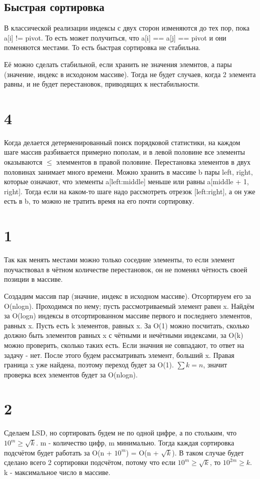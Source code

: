 \documentclass[12pt]{extarticle}
\begin{document}
\subsection*{Быстрая сортировка}
В классической реализации индексы с двух сторон изменяются до тех пор, пока a[i] != pivot. То есть может получиться, что a[i] == a[j] == pivot и они поменяются местами. То есть быстрая сортировка не стабильна.

Её можно сделать стабильной, если хранить не значения элемнтов, а пары (значение, индекс в исходоном массиве). Тогда не будет случаев, когда 2 элемента равны, и не будет перестановок, приводящих к нестабильности.


\section*{4}
Когда делается детерменированный поиск порядковой статистики, на каждом шаге массив разбивается примерно пополам, и в левой половине все элементы оказываются $\le$ элемментов в правой половине. Перестановка элементов в двух половинах занимает много времени. Можно хранить в массиве b пары {left, right}, которые означают, что элементы a[left:middle] меньше или равны a[middle + 1, right]. Тогда если на каком-то шаге надо рассмотреть отрезок [left:right], а он уже есть в b, то можно не тратить время на его почти сортировку.

\section*{1}
Так как менять местами можно только соседние элементы, то если элемент поучаствовал в чётном количестве перестановок, он не поменял чётность своей позиции в массиве.

Создадим массив пар (значние, индекс в исходном массиве). Отсортируем его за O(nlogn). Проходимся по нему; пусть рассмотриваемый элемент равен x. Найдём за O(logn) индексы в отсортированном массиве первого и последнего элементов, равных x. Пусть есть k элементов, равных x. За O(1) можно посчитать, сколько должно быть элементов равных x с чётными и нечётными индексами, за O(k) можно проверить, сколько таких есть. Если значния не совпадают, то ответ на задачу - нет. После этого будем рассматривать элемент, больший x. Правая граница x уже найдена, поэтому переход будет за O(1). $\sum k = n$, значит проверка всех элементов будет за O(nlogn). 

\section*{2}
Сделаем LSD, но сортировать будем не по одной цифре, а по стольким, что $10^m \ge \sqrt{k}$. m - количество цифр, m минимально. Тогда каждая сортировка подсчётом будет работать за O(n + $10^m$) = O(n + $\sqrt{k}$). В таком случае будет сделано всего 2 сортировки подсчётом, потому что если $10^m \ge \sqrt{k}$, то $10^{2m} \ge k$. k - максимальное число в массиве.
\end{document}

